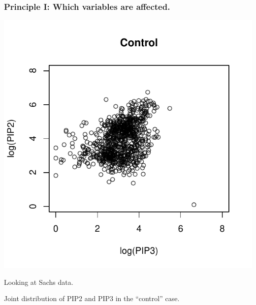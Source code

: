 \documentclass{beamer}
\begin{document}
\begin{frame}
\frametitle{Principle I: Which variables are affected.}

\begin{center}
\includegraphics[scale = 0.5]{../images/plot01_01.pdf}
\end{center}

Looking at Sachs data.

Joint distribution of PIP2 and PIP3 in the ``control'' case.

\end{frame}
\end{document}
